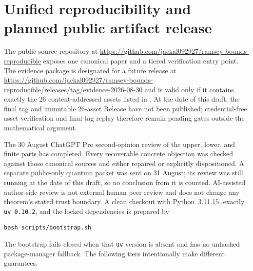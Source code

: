 \section{Unified reproducibility and planned public artifact release}
\label{sec:unified-reproducibility}

The public source repository at
\url{https://github.com/jackal092927/ramsey-bounds-reproducible}
exposes one canonical paper and a tiered verification entry point.  The
evidence package is designated for a future release at
\url{https://github.com/jackal092927/ramsey-bounds-reproducible/releases/tag/evidence-2026-08-30}
and is valid only if it contains exactly the 26 content-addressed assets
listed in .  At the date of this draft,
the final tag and immutable 26-asset Release have not been published;
credential-free asset verification and final-tag replay therefore remain
pending gates outside the mathematical argument.

The 30 August ChatGPT Pro second-opinion review of the upper, lower, and finite
parts has completed.  Every recoverable concrete objection was checked
against those canonical sources and either repaired or explicitly
dispositioned.  A separate public-only quantum packet was sent on 31 August;
its review was still running at the date of this draft, so no conclusion from
it is counted.  AI-assisted author-side review is not external human peer
review and does not change any theorem's stated trust boundary.
A clean checkout with Python~3.11.15, exactly
\texttt{uv 0.10.2}, and the locked dependencies is prepared by
\begin{verbatim}
bash scripts/bootstrap.sh
\end{verbatim}
The bootstrap fails closed when that \texttt{uv} version is absent and has no
unhashed package-manager fallback.
The following tiers intentionally make different guarantees.

